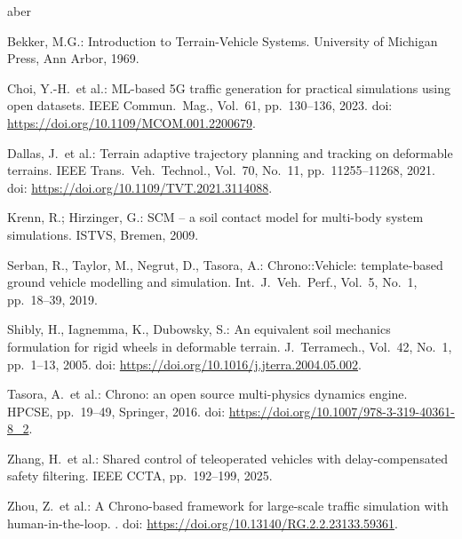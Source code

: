 \documentclass{acmd2026_abstract}
\begin{document}
\vspace{-6pt}
\enlargethispage{28pt}
{\scriptsize
\raggedright
\sloppy
\begin{thebibliography}{aber}
\setlength{\itemsep}{-5pt}
\setlength{\parsep}{0pt}
\setlength{\topsep}{-6pt}
\setlength{\labelsep}{0.5em}

  Bekker, M.G.: Introduction to Terrain-Vehicle Systems.
  \newblock University of Michigan Press, Ann Arbor, 1969.

  Choi, Y.-H.~et al.: ML-based 5G traffic generation for practical simulations using open datasets.
  \newblock IEEE Commun.\ Mag., Vol.~61, pp.~130--136, 2023.
  \newblock doi: \url{https://doi.org/10.1109/MCOM.001.2200679}.

  Dallas, J.~et al.: Terrain adaptive trajectory planning and tracking on deformable terrains.
  \newblock IEEE Trans.\ Veh.\ Technol., Vol.~70, No.~11, pp.~11255--11268, 2021.
  \newblock doi: \url{https://doi.org/10.1109/TVT.2021.3114088}.

  Krenn, R.; Hirzinger, G.:
  SCM -- a soil contact model for multi-body system simulations.
  \newblock ISTVS, Bremen, 2009.

  Serban, R., Taylor, M., Negrut, D., Tasora, A.: Chrono::Vehicle: template-based ground vehicle modelling and simulation.
  \newblock Int.\ J.\ Veh.\ Perf., Vol.~5, No.~1, pp.~18--39, 2019.

  Shibly, H., Iagnemma, K., Dubowsky, S.: An equivalent soil mechanics formulation for rigid wheels in deformable terrain.
  \newblock J.\ Terramech., Vol.~42, No.~1, pp.~1--13, 2005.
  \newblock doi: \url{https://doi.org/10.1016/j.jterra.2004.05.002}.

  Tasora, A.~et al.: Chrono: an open source multi-physics dynamics engine.
  \newblock HPCSE, pp.~19--49, Springer, 2016.
  \newblock doi: \url{https://doi.org/10.1007/978-3-319-40361-8_2}.

  Zhang, H.~et al.: Shared control of teleoperated vehicles with delay-compensated safety filtering.
  \newblock IEEE CCTA, pp.~192--199, 2025.

  Zhou, Z.~et al.: A Chrono-based framework for large-scale traffic simulation with human-in-the-loop.
  .
  \newblock doi: \url{https://doi.org/10.13140/RG.2.2.23133.59361}.

\end{thebibliography}
\par
}
\end{document}
